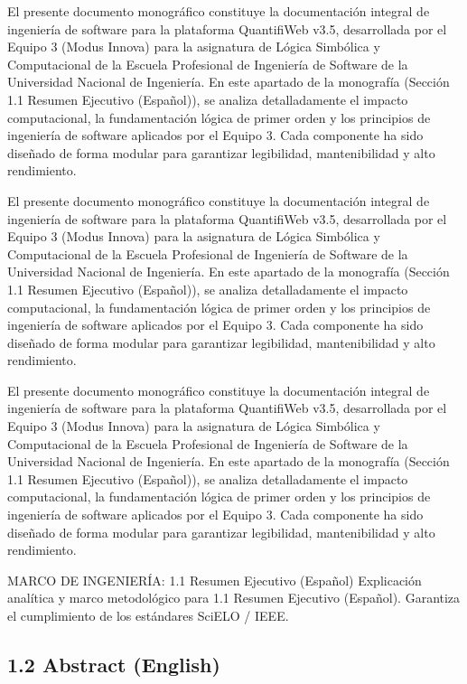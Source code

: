 \documentclass[11pt,a4paper]{article}
\begin{document}
El presente documento monográfico constituye la documentación integral
de ingeniería de software para la plataforma QuantifiWeb v3.5,
desarrollada por el Equipo 3 (Modus Innova) para la asignatura de Lógica
Simbólica y Computacional de la Escuela Profesional de Ingeniería de
Software de la Universidad Nacional de Ingeniería. En este apartado de
la monografía (Sección 1.1 Resumen Ejecutivo (Español)), se analiza
detalladamente el impacto computacional, la fundamentación lógica de
primer orden y los principios de ingeniería de software aplicados por el
Equipo 3. Cada componente ha sido diseñado de forma modular para
garantizar legibilidad, mantenibilidad y alto rendimiento.

El presente documento monográfico constituye la documentación integral
de ingeniería de software para la plataforma QuantifiWeb v3.5,
desarrollada por el Equipo 3 (Modus Innova) para la asignatura de Lógica
Simbólica y Computacional de la Escuela Profesional de Ingeniería de
Software de la Universidad Nacional de Ingeniería. En este apartado de
la monografía (Sección 1.1 Resumen Ejecutivo (Español)), se analiza
detalladamente el impacto computacional, la fundamentación lógica de
primer orden y los principios de ingeniería de software aplicados por el
Equipo 3. Cada componente ha sido diseñado de forma modular para
garantizar legibilidad, mantenibilidad y alto rendimiento.

El presente documento monográfico constituye la documentación integral
de ingeniería de software para la plataforma QuantifiWeb v3.5,
desarrollada por el Equipo 3 (Modus Innova) para la asignatura de Lógica
Simbólica y Computacional de la Escuela Profesional de Ingeniería de
Software de la Universidad Nacional de Ingeniería. En este apartado de
la monografía (Sección 1.1 Resumen Ejecutivo (Español)), se analiza
detalladamente el impacto computacional, la fundamentación lógica de
primer orden y los principios de ingeniería de software aplicados por el
Equipo 3. Cada componente ha sido diseñado de forma modular para
garantizar legibilidad, mantenibilidad y alto rendimiento.

\medskip\hrulefill\medskip
 MARCO DE INGENIERÍA: 1.1 Resumen Ejecutivo (Español)
Explicación analítica y marco metodológico para 1.1 Resumen Ejecutivo
(Español). Garantiza el cumplimiento de los estándares SciELO / IEEE.
\medskip\hrulefill\medskip

\medskip\hrulefill\medskip

\subsection{1.2 Abstract (English)}
\end{document}
